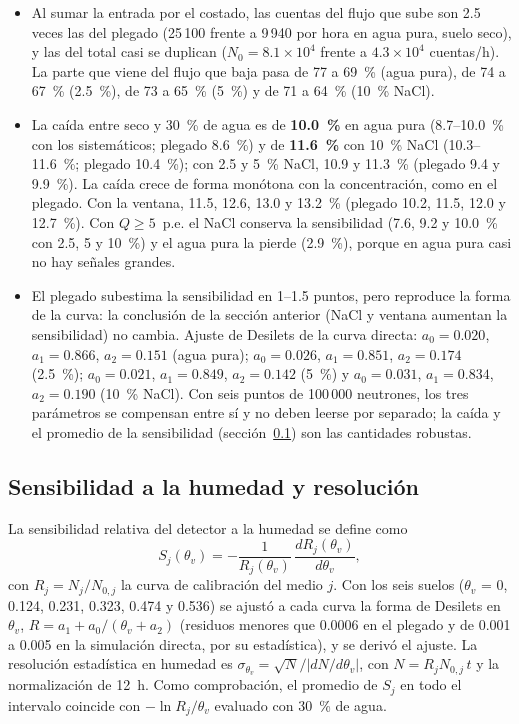 \documentclass[11pt,a4paper]{article}
\begin{document}
\begin{itemize}
\item Al sumar la entrada por el costado, las cuentas del flujo que sube son 2.5 veces las del plegado (25\,100
frente a 9\,940 por hora en agua pura, suelo seco), y las del total casi se duplican ($N_0 = 8.1\times10^4$ frente a
$4.3\times10^4$ cuentas/h). La parte que viene del flujo que baja pasa de 77 a 69~\% (agua pura), de 74 a 67~\% (2.5~\%), de 73 a
65~\% (5~\%) y de 71 a 64~\% (10~\% NaCl).
\item La caída entre seco y 30~\% de agua es de \textbf{10.0~\%} en agua pura (8.7--10.0~\% con los sistemáticos;
plegado 8.6~\%) y de \textbf{11.6~\%} con 10~\% NaCl (10.3--11.6~\%; plegado 10.4~\%); con 2.5 y 5~\% NaCl, 10.9 y 11.3~\% (plegado 9.4 y 9.9~\%). La caída crece de forma
monótona con la concentración, como en el plegado. Con la ventana, 11.5, 12.6, 13.0 y 13.2~\% (plegado 10.2, 11.5, 12.0 y
12.7~\%). Con $Q\geq5$~p.e. el NaCl conserva la sensibilidad (7.6, 9.2 y 10.0~\% con 2.5, 5 y 10~\%) y el agua pura la
pierde (2.9~\%), porque en agua pura casi no hay señales grandes.
\item El plegado subestima la sensibilidad en 1--1.5 puntos, pero reproduce la forma de la curva: la conclusión de la
sección anterior (NaCl y ventana aumentan la sensibilidad) no cambia. Ajuste de Desilets de la curva directa: $a_0 =
0.020$, $a_1 = 0.866$, $a_2 = 0.151$ (agua pura); $a_0 = 0.026$, $a_1 = 0.851$, $a_2 = 0.174$ (2.5~\%); $a_0 = 0.021$,
$a_1 = 0.849$, $a_2 = 0.142$ (5~\%) y $a_0 = 0.031$, $a_1 = 0.834$, $a_2 = 0.190$ (10~\% NaCl). Con seis puntos de
100\,000 neutrones, los tres parámetros se compensan entre sí y no deben leerse por separado; la caída y el promedio de la
sensibilidad (sección~\ref{sec:sens}) son las cantidades robustas.
\end{itemize}

\subsection{Sensibilidad a la humedad y resolución}\label{sec:sens}
La sensibilidad relativa del detector a la humedad se define como
\begin{equation}
	S_j(\theta_v) = -\frac{1}{R_j(\theta_v)}\,\frac{dR_j(\theta_v)}{d\theta_v},
\end{equation}
con $R_j = N_j/N_{0,j}$ la curva de calibración del medio $j$. Con los seis suelos ($\theta_v$ = 0, 0.124, 0.231, 0.323,
0.474 y 0.536) se ajustó a cada curva la forma de Desilets en $\theta_v$, $R = a_1 + a_0/(\theta_v + a_2)$ (residuos
menores que 0.0006 en el plegado y de 0.001 a 0.005 en la simulación directa, por su estadística), y se derivó el ajuste.
La resolución estadística en humedad es $\sigma_{\theta_v} = \sqrt{N}/|dN/d\theta_v|$, con $N = R_j N_{0,j}\,t$ y la
normalización de 12~h. Como comprobación, el promedio de $S_j$ en todo el intervalo coincide con
$-\ln R_j/\theta_v$ evaluado con 30~\% de agua.
\end{document}
